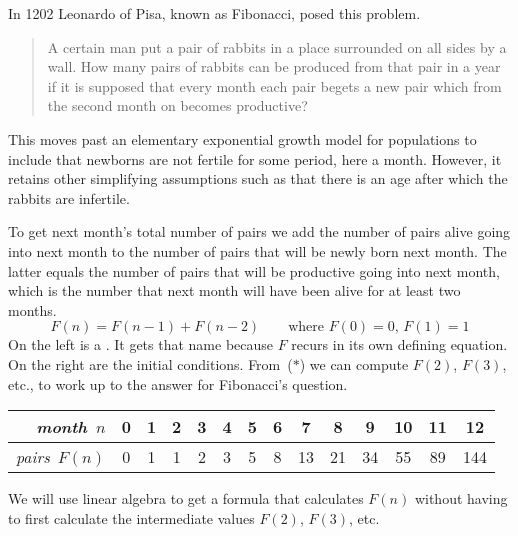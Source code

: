 
In 1202 Leonardo of Pisa, known as Fibonacci, posed this problem.
\begin{quotation}
  \noindent A certain man put a pair of rabbits in a place
  surrounded on all sides by a wall.
  How many pairs of rabbits can be produced from that pair in a year if it
  is supposed that every month each pair begets a new pair which from the
  second month on becomes productive?
\end{quotation}
This moves past an elementary exponential growth model for
populations
to include that newborns are not fertile for some period, here a month.
However, it retains other simplifying assumptions such as  
that there is an age after which the rabbits are infertile.

To get next month's total number of pairs 
we add the number of pairs alive going into next month to
the number of pairs that will be newly born next month.
The latter equals the number of pairs that will be 
productive going into next month, which is the number that next month will 
have been alive for at least two months.
\begin{equation*}
  F(n)=F(n-1)+F(n-2)  \qquad \text{where $F(0)=0$, $F(1)=1$}
  \tag{$*$}
\end{equation*}
On the left is a
.
It gets that name 
because $F$ recurs in its own defining equation.
On the right are the initial conditions.
From~($*$) we can compute $F(2)$, $F(3)$, etc., 
to work up to the answer for Fibonacci's question.
\begin{center}
  \begin{tabular}{r|ccccccccccccc}
    \textit{month}~$n$
     &0  &1  &2  &3  &4  &5  &6  &7  &8  &9  &10  &11  &12  \\ \hline
    \textit{pairs}~$F(n)$
     &0  &1  &1  &2  &3  &5  &8  &13  &21  &34  &55  &89  &144   
  \end{tabular}
\end{center}
We will use linear algebra to get a formula that
calculates $F(n)$ without having to first calculate the intermediate 
values $F(2)$, $F(3)$, etc.

